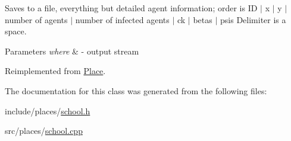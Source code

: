 Saves to a file, everything but detailed agent information; order is ID $\vert$ x $\vert$ y $\vert$ number of agents $\vert$ number of infected agents $\vert$ ck $\vert$ betas $\vert$ psis Delimiter is a space. 
\begin{DoxyParams}{Parameters}
{\em where} & -\/ output stream \\
\hline
\end{DoxyParams}


Reimplemented from \hyperlink{classPlace_a9aa7649e0b91c5f61a5f71e9ca808fe1}{Place}.



The documentation for this class was generated from the following files\+:\begin{DoxyCompactItemize}
\item 
include/places/\hyperlink{school_8h}{school.\+h}\item 
src/places/\hyperlink{school_8cpp}{school.\+cpp}\end{DoxyCompactItemize}
